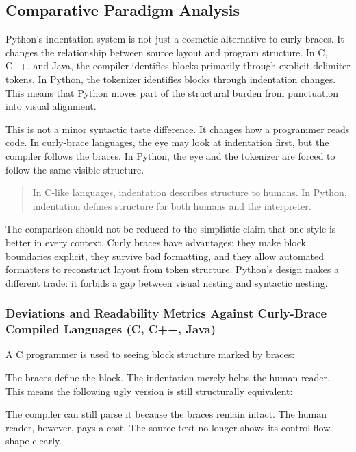 \subsection{Comparative Paradigm Analysis}

Python's indentation system is not just a cosmetic alternative to curly braces. It changes the relationship between source layout and program structure. In C, C++, and Java, the compiler identifies blocks primarily through explicit delimiter tokens. In Python, the tokenizer identifies blocks through indentation changes. This means that Python moves part of the structural burden from punctuation into visual alignment.

This is not a minor syntactic taste difference. It changes how a programmer reads code. In curly-brace languages, the eye may look at indentation first, but the compiler follows the braces. In Python, the eye and the tokenizer are forced to follow the same visible structure.

\begin{quote}
In C-like languages, indentation describes structure to humans. In Python, indentation defines structure for both humans and the interpreter.
\end{quote}

The comparison should not be reduced to the simplistic claim that one style is better in every context. Curly braces have advantages: they make block boundaries explicit, they survive bad formatting, and they allow automated formatters to reconstruct layout from token structure. Python's design makes a different trade: it forbids a gap between visual nesting and syntactic nesting.

\subsubsection{Deviations and Readability Metrics Against Curly-Brace Compiled Languages (C, C++, Java)}

A C programmer is used to seeing block structure marked by braces:

The braces define the block. The indentation merely helps the human reader. This means the following ugly version is still structurally equivalent:

The compiler can still parse it because the braces remain intact. The human reader, however, pays a cost. The source text no longer shows its control-flow shape clearly.

